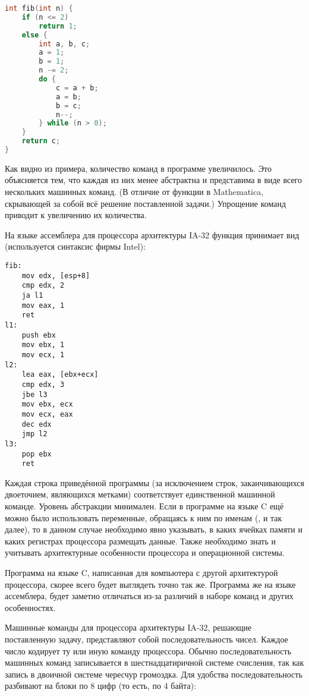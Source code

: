 \begin{lstlisting}[language=C]
int fib(int n) {
    if (n <= 2)
        return 1;
    else {
        int a, b, c;
        a = 1;
        b = 1;
        n -= 2;
        do {
            c = a + b;
            a = b;
            b = c;
            n--;
        } while (n > 0);
    }
    return c;
}
\end{lstlisting}

Как видно из примера, количество команд в программе увеличилось. Это
объясняется тем, что каждая из них менее абстрактна и представима в
виде всего нескольких машинных команд. (В отличие от функции
 в Mathematica, скрывающей за собой всё решение
поставленной задачи.) Упрощение команд приводит к увеличению их
количества.

На языке ассемблера для процессора архитектуры IA-32 функция принимает
вид (используется синтаксис фирмы Intel):

\begin{lstlisting}[language={[x86masm]Assembler}]
fib:
    mov edx, [esp+8]
    cmp edx, 2
    ja l1
    mov eax, 1
    ret
l1:
    push ebx
    mov ebx, 1
    mov ecx, 1
l2:
    lea eax, [ebx+ecx]
    cmp edx, 3
    jbe l3
    mov ebx, ecx
    mov ecx, eax
    dec edx
    jmp l2
l3:
    pop ebx
    ret
\end{lstlisting}

Каждая строка приведённой программы (за исключением строк,
заканчивающихся двоеточием, являющихся метками) соответствует
единственной машинной команде. Уровень абстракции минимален. Если в
программе на языке C ещё можно было использовать переменные, обращаясь
к ним по именам (,  и так далее), то в данном случае
необходимо явно указывать, в каких ячейках памяти и каких регистрах
процессора размещать данные. Также необходимо знать и учитывать
архитектурные особенности процессора и операционной системы.

Программа на языке C, написанная для компьютера с другой архитектурой
процессора, скорее всего будет выглядеть точно так же. Программа же на
языке ассемблера, будет заметно отличаться из-за различий в наборе
команд и других особенностях.

Машинные команды для процессора архитектуры IA-32, решающие
поставленную задачу, представляют собой последовательность
чисел. Каждое число кодирует ту или иную команду процессора. Обычно
последовательность машинных команд записывается в шестнадцатиричной
системе счисления, так как запись в двоичной системе чересчур
громоздка. Для удобства последовательность разбивают на блоки по 8
цифр (то есть, по 4 байта):

